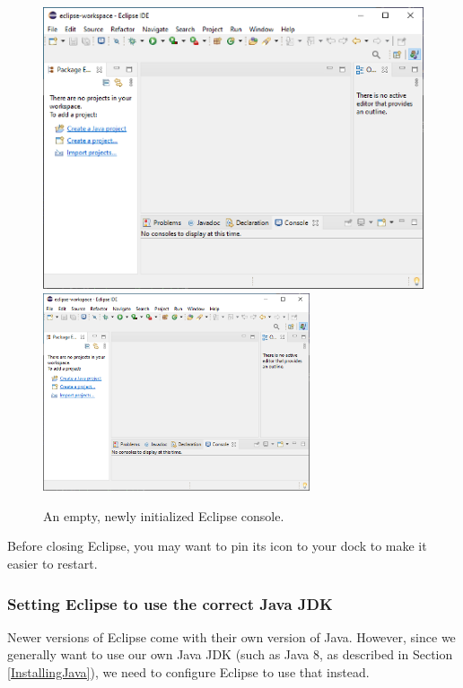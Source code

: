 \begin{figure}[ht]
\begin{center}
\iflatexml
   \includegraphics[]{images/EmptyEclipse}
\else
   \includegraphics[width=0.7\textwidth]{images/EmptyEclipse}
\fi
\end{center}
\caption{An empty, newly initialized Eclipse console.}
\label{EmptyEclipse:fig}
\end{figure}

\ifMacOS
\begin{sideblock}
Before closing Eclipse, you may want to pin its icon to your dock
to make it easier to restart.
\end{sideblock}
\fi

\subsubsection{Setting Eclipse to use the correct Java JDK}
\label{EclipseJDK:sec}

Newer versions of Eclipse come with their own version of
Java. However, since we generally want to use our own Java JDK (such
as Java 8, as described in Section \ref{InstallingJava}), we need to
configure Eclipse to use that instead. 

